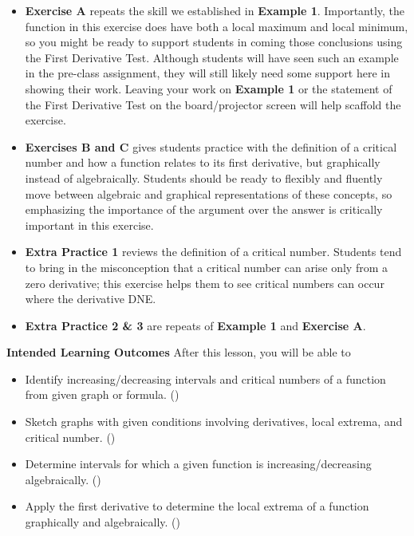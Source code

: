 \documentclass[10pt]{article}
\newcounter{example}[section]
\newcounter{exercise}[section]
\begin{document}
\begin{itemize}
\begin{itemize}
    \item In part (c), we need to model how students should write their answers. Stating the conclusion by directly invoking the statement of the First Derivative Test helps model how conclusions in mathematics are directly connected to established facts, so you might say something like ``$g'$ does not change signs at the critical number $x=1$, so $g$ has neither a local maximum nor local minimum there by the First Derivative Test."
    \end{itemize} 
\item {\bf\color{blue} Exercise A} repeats the skill we established in {\bf\color{blue}Example 1}. Importantly, the function in this exercise does have both a local maximum and local minimum, so you might be ready to support students in coming those conclusions using the First Derivative Test. Although students will have seen such an example in the pre-class assignment, they will still likely need some support here in showing their work. Leaving your work on {\bf\color{blue}Example 1} or the statement of the First Derivative Test on the board/projector screen will help scaffold the exercise.
\item {\bf\color{blue} Exercises B and C} gives students practice with the definition of a critical number and how a function relates to its first derivative, but graphically instead of algebraically. Students should be ready to flexibly and fluently move between algebraic and graphical representations of these concepts, so emphasizing the importance of the argument over the answer is critically important in this exercise.
\item {\bf\color{blue} Extra Practice 1} reviews the definition of a critical number. Students tend to bring in the misconception that a critical number can arise only from a zero derivative; this exercise helps them to see critical numbers can occur where the derivative DNE.
\item {\bf\color{blue} Extra Practice 2 \& 3} are repeats of {\bf\color{blue}Example 1} and {\bf\color{blue}Exercise A}.
\end{itemize}

\newpage%

\pagestyle{otherpages}
\thispagestyle{firstpage}

\textbf{Intended Learning Outcomes}
After this lesson, you will be able to 

\begin{itemize}
    \item Identify increasing/decreasing intervals and critical numbers of a function from given graph or formula. ()
    \item Sketch graphs with given conditions involving derivatives, local extrema, and critical number. ()
    \item Determine intervals for which a given function is increasing/decreasing algebraically. ()
    \item Apply the first derivative to determine the local extrema of a function graphically and algebraically. ()
\end{itemize}
\end{document}
